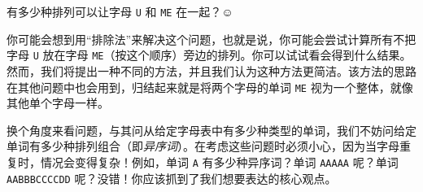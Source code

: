 \begin{example}
    有多少种排列可以让字母 \verb|U| 和 \verb|ME| 在一起？$\smiley{}$

    你可能会想到用``排除法''来解决这个问题，也就是说，你可能会尝试计算所有不把字母 \verb|U| 放在字母 \verb|ME|（按这个顺序）旁边的排列。你可以试试看会得到什么结果。然而，我们将提出一种不同的方法，并且我们认为这种方法更简洁。该方法的思路在其他问题中也会用到，归结起来就是将两个字母的单词 \verb|ME| 视为一个整体，就像其他单个字母一样。

    换个角度来看问题，与其问从给定字母表中有多少种类型的单词，我们不妨问给定单词有多少种排列组合（即\emph{异序词}）。在考虑这些问题时必须小心，因为当字母重复时，情况会变得复杂！例如，单词 \verb|A| 有多少种异序词？单词 \verb|AAAAA| 呢？单词 \verb|AABBBCCCCDD| 呢？没错！你应该抓到了我们想要表达的核心观点。
\end{example}

